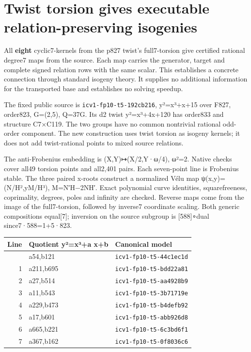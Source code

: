 \documentclass[
  10pt,
]{article}
\author{}
\date{}
\begin{document}
\section{Twist torsion gives executable relation-preserving
isogenies}\label{twist-torsion-gives-executable-relation-preserving-isogenies}

All \textbf{eight} cyclic7-kernels from the p827 twist's full7-torsion
give certified rational degree7 maps from the source. Each map carries
the generator, target and complete signed relation rows with the same
scalar. This establishes a concrete connection through standard isogeny
theory. It supplies no additional information for the transported base
and establishes no solving speedup.

The fixed public source is \texttt{icv1-fp10-t5-192cb216}, y²=x³+x+15
over F827, order823, G=(2,5), Q=37G. Its d2 twist y²=x³+4x+120 has
order833 and structure C7×C119. The two groups have no common nontrivial
rational odd-order component. The new construction uses twist torsion as
isogeny kernels; it does not add twist-rational points to mixed source
relations.

The anti-Frobenius embedding is (X,Y)↦(X/2,Y·ω/4), ω²=2. Native checks
cover all49 torsion points and all2,401 pairs. Each seven-point line is
Frobenius stable. The three paired x-roots construct a normalized Vélu
map ψ(x,y)=(N/H²,yM/H³), M=N′H−2NH′. Exact polynomial curve identities,
squarefreeness, coprimality, degrees, poles and infinity are checked.
Reverse maps come from the image of the full7-torsion, followed by
inverse7 coordinate scaling. Both generic compositions equal{[}7{]};
inversion on the source subgroup is {[}588{]}∘dual since7·588=1+5·823.

\begin{longtable}[]{@{}rll@{}}
\toprule\noalign{}
Line & Quotient y²=x³+a x+b & Canonical model \\
\midrule\noalign{}
\endhead
\bottomrule\noalign{}
\endlastfoot
0 & a54,b121 & \texttt{icv1-fp10-t5-44c1ec1d} \\
1 & a211,b695 & \texttt{icv1-fp10-t5-bdd22a81} \\
2 & a27,b514 & \texttt{icv1-fp10-t5-aa4928b9} \\
3 & a11,b543 & \texttt{icv1-fp10-t5-3b71719e} \\
4 & a229,b473 & \texttt{icv1-fp10-t5-b4defb92} \\
5 & a17,b601 & \texttt{icv1-fp10-t5-abb926d8} \\
6 & a665,b221 & \texttt{icv1-fp10-t5-6c3bd6f1} \\
7 & a367,b162 & \texttt{icv1-fp10-t5-0f8036c6} \\
\end{longtable}
\end{document}
